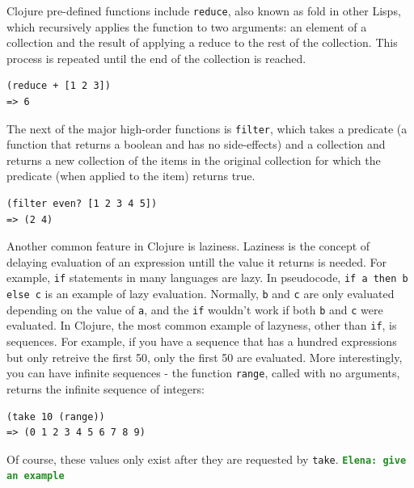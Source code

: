 \documentclass[12pt]{article}
\newcommand{\comment}[1]{{\bf \tt  {#1}}}
\newcommand{\emcomment}[1]{\textcolor{ForestGreen}{\comment{Elena: {#1}}}}
\newcommand{\clocode}[1]{{\texttt {#1}}}
\begin{document}
Clojure pre-defined functions include \clocode{reduce}, also known as fold in other Lisps, which recursively applies the function to two arguments: an element of a collection and the result of applying a reduce to the rest of the collection. This process is repeated until the end of the collection is reached. 
\begin{verbatim}
(reduce + [1 2 3])
=> 6
\end{verbatim}
The next of the major high-order functions is \clocode{filter}, which takes a predicate (a function that returns a boolean and has no side-effects) and a collection and returns a new collection of the items in the original collection for which the predicate (when applied to the item) returns true.
\begin{verbatim}
(filter even? [1 2 3 4 5])
=> (2 4)
\end{verbatim}
Another common feature in Clojure is laziness. Laziness is the concept of delaying evaluation of an expression untill the value it returns is needed. For example, \clocode{if} statements in many languages are lazy. In pseudocode, \clocode{if a then b else c} is an example of lazy evaluation. Normally, \clocode{b} and \clocode{c} are only evaluated depending on the value of \clocode{a}, and the \clocode{if} wouldn't work if both \clocode{b} and \clocode{c} were evaluated. 
In Clojure, the most common example of lazyness, other than \clocode{if}, is sequences. For example, if you have a sequence that has a hundred expressions but only retreive the first 50, only the first 50 are evaluated. More interestingly, you can have infinite sequences - the function \clocode{range}, called with no arguments, returns the infinite sequence of integers:
\begin{verbatim}
(take 10 (range))
=> (0 1 2 3 4 5 6 7 8 9)
\end{verbatim}
Of course, these values only exist after they are requested by \clocode{take}.
\emcomment{give an example}
\end{document}
